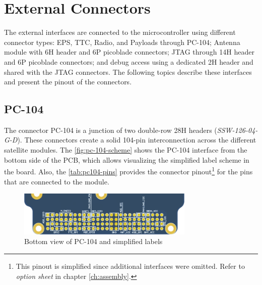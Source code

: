 \section{External Connectors}

The external interfaces are connected to the microcontroller using different connector types: EPS, TTC, Radio, and Payloads through PC-104; Antenna module with 6H header and 6P picoblade connectors; JTAG through 14H header and 6P picoblade connectors; and debug access using a dedicated 2H header and shared with the JTAG connectors. The following topics describe these interfaces and present the pinout of the connectors.

\addtocounter{footnote}{1}

\subsection{PC-104} \label{sec:pc104}


The connector PC-104 is a junction of two double-row 28H headers (\textit{SSW-126-04-G-D}). These connectors create a solid 104-pin interconnection across the different satellite modules. The \autoref{fig:pc-104-scheme} shows the PC-104 interface from the bottom side of the PCB, which allows visualizing the simplified label scheme in the board. Also, the \autoref{tab:pc104-pins} provides the connector pinout\footnote{This pinout is simplified since additional interfaces were omitted. Refer to \textit{option sheet} in chapter \ref{ch:assembly}.} for the pins that are connected to the module.

\begin{figure}[!ht]
    \begin{center}
        \includegraphics[width=0.75\textwidth]{figures/pc-104-scheme.png}
        \caption{Bottom view of PC-104 and simplified labels}
        \label{fig:pc-104-scheme}
    \end{center}
\end{figure}

